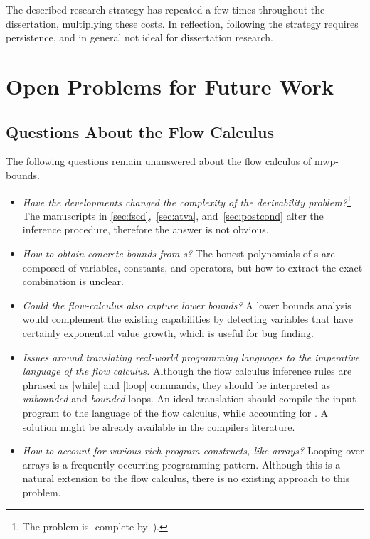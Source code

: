 The described research strategy has repeated a few times throughout the
dissertation, multiplying these costs. In reflection, following the strategy
requires persistence, and in general not ideal for dissertation research.

\section{Open Problems for Future Work}
\label{sec:res-future}

\subsection{Questions About the Flow Calculus}
\label{ssec:mwp-open}

The following questions remain unanswered about the flow calculus of
mwp-bounds.

\begin{itemize}
\item \emph{Have the developments changed the complexity of the derivability
        problem?}\footnote{The problem is -complete by~\cite[p.
        37]{jones2009}).}
      The manuscripts in \autoref{sec:fscd},~\autoref{sec:atva},
      and~\autoref{sec:postcond} alter the inference procedure, therefore the
      answer is not obvious.

\item \emph{How to obtain concrete bounds from s?}
      The honest polynomials of s are composed of variables,
      constants, and operators, but how to extract the exact combination is
      unclear.

\item \emph{Could the flow-calculus also capture lower bounds?}
      A lower bounds analysis would complement the existing capabilities by
      detecting variables that have certainly exponential value growth, which
      is useful \eg for bug finding.

\item \emph{Issues around translating real-world programming languages to the
      imperative language of the flow calculus.}
      Although the flow calculus inference rules are phrased as \pr|while| and
      \pr|loop| commands, they should be interpreted as \emph{unbounded} and
      \emph{bounded} loops. An ideal translation should compile the input
      program to the language of the flow calculus, while accounting for . A solution might be already available in the
      compilers literature.

\item \emph{How to account for various rich program constructs,
      like arrays?}
     Looping over arrays is a frequently occurring programming pattern.
     Although this is a natural extension to the flow calculus,
     there is no existing approach to this problem.

\end{itemize}

